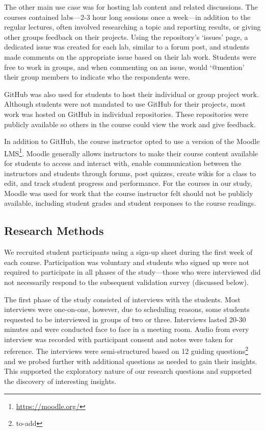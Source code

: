 The other main use case was for hosting lab content and related discussions. The courses contained labs---2-3 hour long sessions once a week---in addition to the regular lectures, often involved researching a topic and reporting results, or giving other groups feedback on their projects. Using the repository's `issues' page, a dedicated issue was created for each lab, similar to a forum post, and students made comments on the appropriate issue based on their lab work. Students were free to work in groups, and when commenting on an issue, would `@mention' their group members to indicate who the respondents were.

GitHub was also used for students to host their individual or group project work. Although students were not mandated to use GitHub for their projects, most work was hosted on GitHub in individual repositories. These repositories were publicly available so others in the course could view the work and give feedback.

In addition to GitHub, the course instructor opted to use a version of the Moodle LMS\footnote{\url{https://moodle.org/}}. Moodle generally allows instructors to make their course content available for students to access and interact with, enable communication between the instructors and students through forums, post quizzes, create wikis for a class to edit, and track student progress and performance. For the courses in our study, Moodle was used for work that the course instructor felt should not be publicly available, including student grades and student responses to the course readings.

\subsection{Research Methods}
We recruited student participants using a sign-up sheet during the first week of each course. Participation was voluntary and students who signed up were not required to participate in all phases of the study---those who were interviewed did not necessarily respond to the subsequent validation survey (discussed below).

The first phase of the study consisted of interviews with the students. Most interviews were one-on-one, however, due to scheduling reasons, some students requested to be interviewed in groups of two or three. Interviews lasted 20-30 minutes and were conducted face to face in a meeting room. Audio from every interview was recorded with participant consent and notes were taken for reference. The interviews were semi-structured based on 12 guiding questions\footnote{to-add} and we probed further with additional questions as needed to gain their insights. This supported the exploratory nature of our research questions and supported the discovery of interesting insights.

